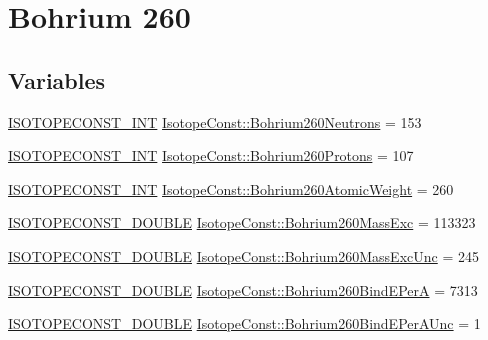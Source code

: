 \hypertarget{group___isotope_const-_bohrium-_bh260}{}\section{Bohrium 260}
\label{group___isotope_const-_bohrium-_bh260}
\subsection*{Variables}
\begin{DoxyCompactItemize}
\item 
\mbox{\hyperlink{group___isotope_const-_macros_ga5f18360b3e99483a35c32d789e62621c}{I\+S\+O\+T\+O\+P\+E\+C\+O\+N\+S\+T\+\_\+\+I\+NT}} \mbox{\hyperlink{group___isotope_const-_bohrium-_bh260_ga71f2c3023deac59b50cc9ea68c1d406f}{Isotope\+Const\+::\+Bohrium260\+Neutrons}} = 153
\item 
\mbox{\hyperlink{group___isotope_const-_macros_ga5f18360b3e99483a35c32d789e62621c}{I\+S\+O\+T\+O\+P\+E\+C\+O\+N\+S\+T\+\_\+\+I\+NT}} \mbox{\hyperlink{group___isotope_const-_bohrium-_bh260_ga1d02d21b17e1528f30f0c0996a42364b}{Isotope\+Const\+::\+Bohrium260\+Protons}} = 107
\item 
\mbox{\hyperlink{group___isotope_const-_macros_ga5f18360b3e99483a35c32d789e62621c}{I\+S\+O\+T\+O\+P\+E\+C\+O\+N\+S\+T\+\_\+\+I\+NT}} \mbox{\hyperlink{group___isotope_const-_bohrium-_bh260_gad43f28a1990ef70ff456b08e4a07bb91}{Isotope\+Const\+::\+Bohrium260\+Atomic\+Weight}} = 260
\item 
\mbox{\hyperlink{group___isotope_const-_macros_ga8f45a7272ce02c0b4c65c44636ed719a}{I\+S\+O\+T\+O\+P\+E\+C\+O\+N\+S\+T\+\_\+\+D\+O\+U\+B\+LE}} \mbox{\hyperlink{group___isotope_const-_bohrium-_bh260_ga448b5d9a2c1d867eb722979b29de80c5}{Isotope\+Const\+::\+Bohrium260\+Mass\+Exc}} = 113323
\item 
\mbox{\hyperlink{group___isotope_const-_macros_ga8f45a7272ce02c0b4c65c44636ed719a}{I\+S\+O\+T\+O\+P\+E\+C\+O\+N\+S\+T\+\_\+\+D\+O\+U\+B\+LE}} \mbox{\hyperlink{group___isotope_const-_bohrium-_bh260_ga9211a667561ec6055a726913f37b1bd3}{Isotope\+Const\+::\+Bohrium260\+Mass\+Exc\+Unc}} = 245
\item 
\mbox{\hyperlink{group___isotope_const-_macros_ga8f45a7272ce02c0b4c65c44636ed719a}{I\+S\+O\+T\+O\+P\+E\+C\+O\+N\+S\+T\+\_\+\+D\+O\+U\+B\+LE}} \mbox{\hyperlink{group___isotope_const-_bohrium-_bh260_gac0bc489fd68de80cb395552a801d6237}{Isotope\+Const\+::\+Bohrium260\+Bind\+E\+PerA}} = 7313
\item 
\mbox{\hyperlink{group___isotope_const-_macros_ga8f45a7272ce02c0b4c65c44636ed719a}{I\+S\+O\+T\+O\+P\+E\+C\+O\+N\+S\+T\+\_\+\+D\+O\+U\+B\+LE}} \mbox{\hyperlink{group___isotope_const-_bohrium-_bh260_ga0c7e43ac6635ae00492e88fb01de41ce}{Isotope\+Const\+::\+Bohrium260\+Bind\+E\+Per\+A\+Unc}} = 1

\end{DoxyCompactItemize}
